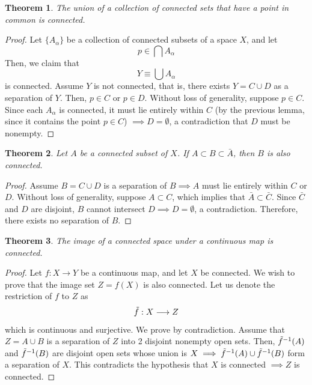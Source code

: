 \documentclass{article}
\newtheorem{theorem}{Theorem}[section]
\theoremstyle{remark}
\theoremstyle{definition}
\begin{document}
\begin{theorem}
The union of a collection of connected sets that have a point in common is connected. 
\end{theorem}
\begin{center}
\end{center}

\begin{proof}
Let $\{A_\alpha\}$ be a collection of connected subsets of a space $X$, and let 
\[p \in \bigcap A_\alpha\]
Then, we claim that 
\[Y \equiv \bigcup A_\alpha\]
is connected. Assume $Y$ is not connected, that is, there exists $Y = C \cup D$ as a separation of $Y$. Then, $p \in C$ or $p \in D$. Without loss of generality, suppose $p \in C$. Since each $A_\alpha$ is connected, it must lie entirely within $C$ (by the previous lemma, since it contains the point $p \in C$) $\implies D = \emptyset$, a contradiction that $D$ must be nonempty. 
\end{proof}

\begin{theorem}
Let $A$ be a connected subset of $X$. If $A \subset B \subset \bar{A}$, then $B$ is also connected. 
\end{theorem}
\begin{proof}
Assume $B = C \cup D$ is a separation of $B \implies A$ must lie entirely within $C$ or $D$. Without loss of generality, suppose $A \subset C$, which implies that $\bar{A} \subset \bar{C}$. Since $\bar{C}$ and $D$ are disjoint, $B$ cannot intersect $D \implies D = \emptyset$, a contradiction. Therefore, there exists no separation of $B$. 
\end{proof}

\begin{theorem}
The image of a connected space under a continuous map is connected. 
\end{theorem}
\begin{proof}
Let $f: X \longrightarrow Y$ be a continuous map, and let $X$ be connected. We wish to prove that the image set $Z = f(X)$ is also connected. Let us denote the restriction of $f$ to $Z$ as
\[\Tilde{f}: X \longrightarrow Z\]
which is continuous and surjective. We prove by contradiction. Assume that $Z = A \cup B$ is a separation of $Z$ into 2 disjoint nonempty open sets. Then, $\Tilde{f}^{-1} (A)$ and $\Tilde{f}^{-1}(B)$ are disjoint open sets whose union is $X \implies \Tilde{f}^{-1} (A) \cup \Tilde{f}^{-1}(B)$ form a separation of $X$. This contradicts the hypothesis that $X$ is connected $\implies Z$ is connected.  
\end{proof}
\end{document}
